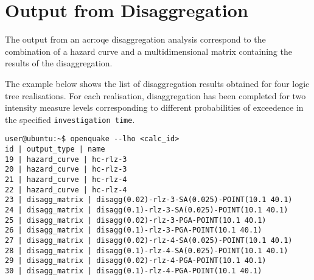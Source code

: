 \section{Output from Disaggregation}
The output from an \gls{acr:oqe} disaggregation analysis  
correspond to the combination of a hazard curve and a multidimensional 
matrix containing the results of the disaggregation.

The example below shows the list of disaggregation results obtained 
for four logic tree realisations. 
For each realisation, disaggregation has been completed for two  
intensity measure levels corresponding to different probabilities of 
exceedence in the specified \texttt{investigation time}.
\begin{Verbatim}[frame=single, commandchars=\\\{\}]
user@ubuntu:~$ openquake --lho <calc_id> 
id | output_type | name
19 | hazard_curve | hc-rlz-3
20 | hazard_curve | hc-rlz-3
21 | hazard_curve | hc-rlz-4
22 | hazard_curve | hc-rlz-4
23 | disagg_matrix | disagg(0.02)-rlz-3-SA(0.025)-POINT(10.1 40.1)
24 | disagg_matrix | disagg(0.1)-rlz-3-SA(0.025)-POINT(10.1 40.1)
25 | disagg_matrix | disagg(0.02)-rlz-3-PGA-POINT(10.1 40.1)
26 | disagg_matrix | disagg(0.1)-rlz-3-PGA-POINT(10.1 40.1)
27 | disagg_matrix | disagg(0.02)-rlz-4-SA(0.025)-POINT(10.1 40.1)
28 | disagg_matrix | disagg(0.1)-rlz-4-SA(0.025)-POINT(10.1 40.1)
29 | disagg_matrix | disagg(0.02)-rlz-4-PGA-POINT(10.1 40.1)
30 | disagg_matrix | disagg(0.1)-rlz-4-PGA-POINT(10.1 40.1)
\end{Verbatim}

